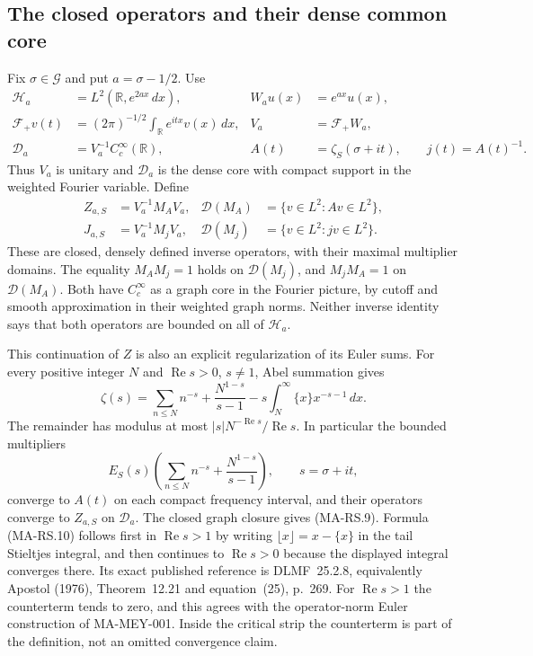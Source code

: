 \subsection{The closed operators and their dense common core}

Fix $\sigma\in\mathscr G$ and put $a=\sigma-1/2$.
Use
\[
 \begin{aligned}
 \mathcal H_a&=L^2(\mathbb R,e^{2ax}\,dx),&
 W_au(x)&=e^{ax}u(x),\\
 \mathcal F_+v(t)&=(2\pi)^{-1/2}
                       \int_{\mathbb R}e^{itx}v(x)\,dx,&
 V_a&=\mathcal F_+W_a,\\
 \mathscr D_a&=V_a^{-1}C_c^\infty(\mathbb R),&
 A(t)&=\zeta_S(\sigma+it),\qquad j(t)=A(t)^{-1}.
 \end{aligned}
 \tag{MA-RS.8}
\]
Thus $V_a$ is unitary and $\mathscr D_a$ is the dense
core with compact support in the weighted Fourier variable.
Define
\[
 \begin{aligned}
 Z_{a,S}&=V_a^{-1}M_A V_a,&
 \mathcal D(M_A)&=\{v\in L^2:Av\in L^2\},\\
 J_{a,S}&=V_a^{-1}M_j V_a,&
 \mathcal D(M_j)&=\{v\in L^2:jv\in L^2\}.
 \end{aligned}
 \tag{MA-RS.9}
\]
These are closed, densely defined inverse operators, with
their maximal multiplier domains.  The equality
$M_A M_j=1$ holds on $\mathcal D(M_j)$, and
$M_j M_A=1$ on $\mathcal D(M_A)$.
Both have $C_c^\infty$ as a graph core in the Fourier
picture, by cutoff and smooth approximation in their
weighted graph norms.  Neither inverse identity says
that both operators are bounded on all of $\mathcal H_a$.

This continuation of $Z$ is also an explicit regularization
of its Euler sums.  For every positive integer $N$ and
$\operatorname{Re}s>0$, $s\ne1$, Abel summation gives
\[
 \zeta(s)=\sum_{n\le N}n^{-s}+\frac{N^{1-s}}{s-1}
           -s\int_N^\infty\{x\}x^{-s-1}\,dx .
 \tag{MA-RS.10}
\]
The remainder has modulus at most
$|s|N^{-\operatorname{Re}s}/\operatorname{Re}s$.
In particular the bounded multipliers
\[
        E_S(s)\left(\sum_{n\le N}n^{-s}
                              +\frac{N^{1-s}}{s-1}\right),
                  \qquad s=\sigma+it,
 \tag{MA-RS.11}
\]
converge to $A(t)$ on each compact frequency interval,
and their operators converge to $Z_{a,S}$ on
$\mathscr D_a$.  The closed graph closure gives (MA-RS.9).
Formula (MA-RS.10) follows first in $\operatorname{Re}s>1$
by writing $\lfloor x\rfloor=x-\{x\}$ in the tail
Stieltjes integral, and then continues to
$\operatorname{Re}s>0$ because the displayed integral
converges there.  Its exact published reference is
DLMF~25.2.8, equivalently Apostol (1976),
Theorem~12.21 and equation~(25), p.~269.
For $\operatorname{Re}s>1$ the counterterm tends to zero,
and this agrees with the operator-norm Euler construction
of MA-MEY-001.  Inside the critical strip the counterterm
is part of the definition, not an omitted convergence claim.

